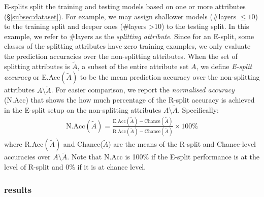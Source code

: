 \documentclass{article} %
\begin{document}
E-splits split the training and testing models based on one or more attributes (\S\ref{subsec:dataset}). For example, we may assign shallower models (\#\ignorespaces layers $\leq 10$) to the training split and deeper ones (\#\ignorespaces layers >10) to the testing split. In this example, we refer to \#\ignorespaces layers as the \emph{splitting attribute}. Since for an E-split, some classes of the splitting attributes have zero training examples, we only evaluate the prediction accuracies over the non-splitting attributes. When the set of splitting attributes is $\tilde{A}$, a subset of the entire attribute set $A$, we define \emph{E-split accuracy} or E.Acc$(\tilde{A})$ to be the mean prediction accuracy over the non-splitting attributes $A\setminus \tilde{A}$.
For easier comparison, we report the \emph{normalised accuracy} (N.Acc) that shows the how much percentage of the R-split accuracy is achieved in the E-split setup on the non-splitting attributes $A\setminus \tilde{A}$. Specifically:
\begin{align}
\label{eq:nacc-def}
\text{N.Acc}(\tilde{A})=\frac{\text{E.Acc}(\tilde{A})-\text{Chance}(\tilde{A})}{\text{R.Acc}(\tilde{A})-\text{Chance}(\tilde{A})} \times 100\%
\end{align}
where R.Acc$(\tilde{A})$ and Chance($\tilde{A}$) are the means of the R-split and Chance-level accuracies over $A\setminus \tilde{A}$. Note that N.Acc is 100\% if the E-split performance is at the level of R-split and 0\% if it is at chance level.


\subsubsection*{results}
\end{document}
